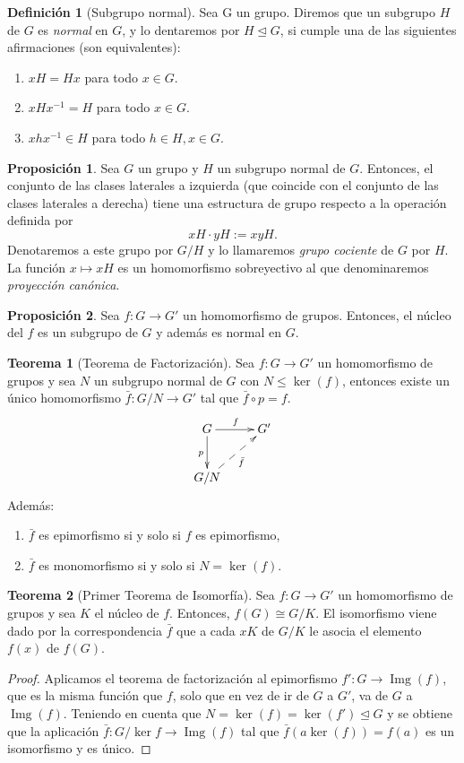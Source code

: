 \documentclass[12pt]{book}
\theoremstyle{definition}
\newtheorem{defi}{Definición}[section]
\newtheorem{teor}{Teorema}[section]
\newtheorem{prop}{Proposición}[section]
\DeclareMathOperator{\img}{Img}
\begin{document}
\begin{defi}[Subgrupo normal]
Sea G un grupo. Diremos que un subgrupo $H$ de $G$ es \textit{normal} en $G$, y lo dentaremos por $H\unlhd G$, si cumple una de las siguientes afirmaciones (son equivalentes):
\begin{enumerate}
\item $xH=Hx$ para todo $x\in G$.
\item $xHx^{-1}=H$ para todo $x\in G$.
\item $xhx^{-1}\in H$ para todo $h\in H, x\in G$.
\end{enumerate}
\end{defi}

\begin{prop}
Sea $G$ un grupo y $H$ un subgrupo normal de $G$. Entonces, el conjunto de las clases laterales a izquierda (que coincide con el conjunto de las clases laterales a derecha) tiene una estructura de grupo respecto a la operación definida por
$$xH\cdot yH:= xyH.$$
Denotaremos a este grupo por $G/H$ y lo llamaremos \textit{grupo cociente} de $G$ por $H$. La función $x\mapsto xH$ es un homomorfismo sobreyectivo al que denominaremos \textit{proyección canónica}.
\end{prop}

\begin{prop}
Sea $f:G\rightarrow G'$ un homomorfismo de grupos. Entonces, el núcleo del $f$ es un subgrupo de $G$ y además es normal en $G$.
\end{prop}

\begin{teor}[Teorema de Factorización]
Sea  $f:G\rightarrow G'$ un homomorfismo de grupos y sea $N$ un subgrupo normal de $G$ con $N\leq \ker(f)$, entonces existe un único homomorfismo $\bar{f}:G/N\rightarrow G'$ tal que $\bar{f}\circ p=f$. 
$$
\xymatrix{
G \ar[d]_p\ar[r]^f & G' \\
G/N \ar@{-->}_{\bar{f}}[ur] &
}
$$
Además:
\begin{enumerate}
\item $\bar{f}$ es epimorfismo si y solo si $f$ es epimorfismo,
\item$\bar{f}$ es monomorfismo si y solo si $N=\ker(f)$.
\end{enumerate}
\end{teor}

\begin{teor}[Primer Teorema de Isomorfía]
Sea $f:G\rightarrow G'$ un homomorfismo de grupos y sea $K$ el núcleo de $f$. Entonces, $f(G)\cong G/K$. El isomorfismo viene dado por la correspondencia $\bar{f}$ que a cada $xK$ de $G/K$ le asocia el elemento $f(x)$ de $f(G)$.
\end{teor}
\begin{proof}
Aplicamos el teorema de factorización al epimorfismo $f':G\rightarrow \img(f)$, que es la misma función que $f$, solo que en vez de ir de $G$ a $G'$, va de $G$ a $\img(f)$. Teniendo en cuenta que $N=\ker(f)=\ker(f')\unlhd G$ y se obtiene que la aplicación $\bar{f}:G/\ker{f}\rightarrow \img(f)$ tal que $\bar{f}(a\ker(f))=f(a)$ es un isomorfismo y es único.
\end{proof}
\end{document}
